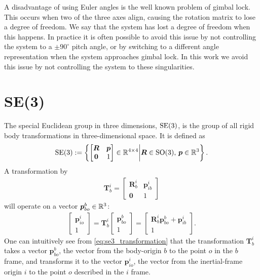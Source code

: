 A disadvantage of using Euler angles is the well known problem of gimbal lock.
This occurs when two of the three axes align, causing the rotation matrix to
lose a degree of freedom. We say that the system has lost a degree of freedom
when this happens. In practice it is often possible to avoid this issue by not
controlling the system to a $\pm90^\circ$ pitch angle, or by switching to a
different angle representation when the system approaches gimbal lock. In this
work we avoid this issue by not controlling the system to these singularities.

\section{SE(3)}
\label{sec:bp:se3}

The special Euclidean group in three dimensions, $\operatorname{SE}(3)$, is the group of all
rigid body transformations in three-dimensional space. It is defined as
\begin{align}
    \operatorname{SE}(3) := \left\{ \begin{bmatrix}
        \bm{R} & \bm{p} \\
        \bm{0} & 1
    \end{bmatrix}
        \in \mathbb{R}^{4 \times 4} \middle| \bm{R} \in \operatorname{SO}(3), \, \bm{p} \in \mathbb{R}^3
    \right\}.
\end{align}
A transformation by 
\begin{align}
    \bm{T}_b^i = \begin{bmatrix}
        \bm{R}_{b}^i & \bm{p}_{ib}^i \\
        \bm{0} & 1
    \end{bmatrix}
\end{align}
will operate on a vector $\bm{p}_{bo}^b \in \mathbb{R}^3$:
\begin{align}
    \begin{bmatrix}
        \bm{p}_{io}^i  \\
        1
    \end{bmatrix}
    =
    \bm{T}_b^i \begin{bmatrix}
        \bm{p}_{bo}^b \\
        1
    \end{bmatrix}
    =
    \begin{bmatrix}
        \bm{R}_{b}^i \bm{p}_{bo}^b + \bm{p}_{ib}^i \\
        1
    \end{bmatrix}.
    \label{eq:se3_transformation}
\end{align}
One can intuitively see from \autoref{eq:se3_transformation} that the transformation
$\bm{T}_b^i$
takes a vector $\bm{p}_{bo}^b$, the vector from the body-origin $b$ to the point $o$
in the $b$ frame, and transforms it to the vector $\bm{p}_{io}^i$, the vector from
the inertial-frame origin $i$ to the point $o$ described in the $i$ frame.


